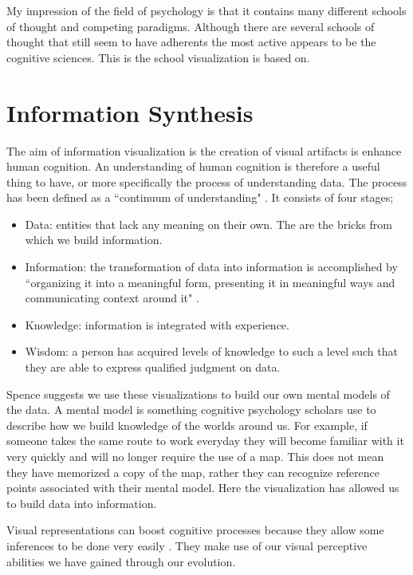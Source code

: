 \documentclass[a4paper, 10pt, titlepage, twocolumn, onehalfspace]{article}
\begin{document}
My impression of the field of psychology is that it contains many different schools of thought and competing paradigms. Although there are several schools of thought that still seem to have adherents the most active appears to be the cognitive sciences. This is the school visualization is based on.

\section{Information Synthesis}
The aim of information visualization is the creation of visual artifacts is enhance human cognition. An understanding of human cognition is therefore a useful thing to have, or more specifically the process of understanding data. The process has been defined as a ``continuum of understanding" \cite{jacobson1999information}. It consists of four stages;
\begin{itemize}
\item Data: entities that lack any meaning on their own. The are the bricks from which we build information.
\item Information: the transformation of data into information is accomplished by ``organizing it into a meaningful form, presenting it in meaningful ways and communicating context around it" \cite{jacobson1999information}.
\item Knowledge: information is integrated with experience.
\item Wisdom: a person has acquired levels of knowledge to such a level such that they are able to express qualified judgment on data.
\end{itemize}

Spence \cite{spence2001information} suggests we use these visualizations to build our own mental models of the data. A mental model is something cognitive psychology scholars use to describe how we build knowledge of the worlds around us. For example, if someone takes the same route to work everyday they will become familiar with it very quickly and will no longer require the use of a map. This does not mean they have memorized a copy of the map, rather they can recognize reference points associated with their mental model. Here the visualization has allowed us to build data into information.


Visual representations can boost cognitive processes because they allow some inferences to be done very easily \cite{card1999readings}. They make use of our visual perceptive abilities we have gained through our evolution.
\end{document}
